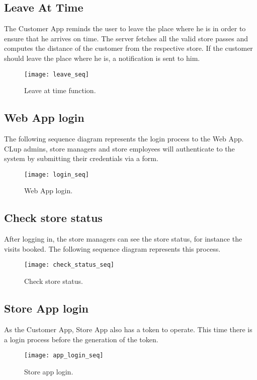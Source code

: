 \clearpage
\subsection{Leave At Time}
The Customer App reminds the user to leave the place where he is in order to ensure that he arrives on time.\newline
The server fetches all the valid store passes and computes the distance of the customer from the respective store. If the customer should leave the place where he is, a notification is sent to him.
\begin{figure}[H]
	\centering
	\texttt{[image: leave\_seq]}
	\caption{Leave at time function.}
	\label{fig:leave_seq}
\end{figure}

\subsection{Web App login}
The following sequence diagram represents the login process to the Web App. CLup admins, store managers and store employees will authenticate to the system by submitting their credentials via a form.
\begin{figure}[H]
	\centering
	\texttt{[image: login\_seq]}
	\caption{Web App login.}
	\label{fig:login_seq}
\end{figure}

\subsection{Check store status}
After logging in, the store managers can see the store status, for instance the visits booked. The following sequence diagram represents this process. 
\begin{figure}[H]
	\centering
	\texttt{[image: check\_status\_seq]}
	\caption{Check store status.}
	\label{fig:check_status_seq}
\end{figure}

\subsection{Store App login}
As the Customer App, Store App also has a token to operate. This time there is a login process before the generation of the token.
\begin{figure}[H]
	\centering
	\texttt{[image: app\_login\_seq]}
	\caption{Store app login.}
	\label{fig:app_login_seq}
\end{figure}

